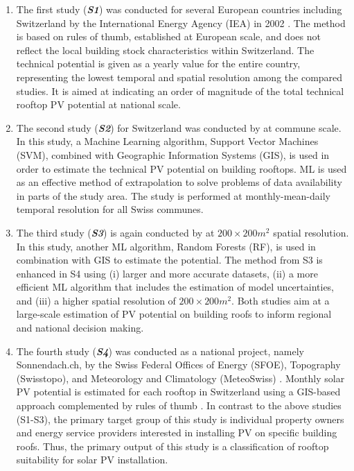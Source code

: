 \begin{enumerate}
\item The first study (\textit{\textbf{S1}}) was conducted for several European countries including Switzerland by the International Energy Agency (IEA) in 2002 \cite{iea_potential_2002}. The method is based on rules of thumb, established at European scale, and does not reflect the local building stock characteristics within Switzerland. The technical potential is given as a yearly value for the entire country, representing the lowest temporal and spatial resolution among the compared studies. It is aimed at indicating an order of magnitude of the total technical rooftop PV potential at national scale. 
\item The second study (\textit{\textbf{S2}}) for Switzerland was conducted by \citet{assouline_quantifying_2017} at commune scale. In this study, a Machine Learning algorithm, Support Vector Machines (SVM), combined with Geographic Information Systems (GIS), is used in order to estimate the technical PV potential on building rooftops. ML is used as an effective method of extrapolation to solve problems of data availability in parts of the study area. The study is performed at monthly-mean-daily temporal resolution for all Swiss communes. 
\item The third study (\textit{\textbf{S3}}) is again conducted by \citet{assouline_large-scale_2018} at $200 \times 200 m^2$ spatial resolution. In this study, another ML algorithm, Random Forests (RF), is used in combination with GIS to estimate the potential. The method from S3 is enhanced in S4 using (i) larger and more accurate datasets, (ii) a more efficient  ML algorithm that includes the estimation of model uncertainties, and (iii) a higher spatial resolution of $200 \times 200 m^2$. Both studies aim at a large-scale estimation of PV potential on building roofs to inform regional and national decision making.
\item The fourth study (\textbf{\textit{S4}}) was conducted as a national project, namely Sonnendach.ch, by the Swiss Federal Offices of Energy (SFOE), Topography (Swisstopo), and Meteorology and Climatology (MeteoSwiss) \cite{klauser_solarpotentialanalyse_2016,portmann_sonnendach.ch:_2016}. Monthly solar PV potential is estimated for each rooftop in Switzerland using a GIS-based approach \cite{klauser_solarpotentialanalyse_2016} complemented by rules of thumb \cite{portmann_sonnendach.ch:_2016}. In contrast to the above studies (S1-S3), the primary target group of this study is individual property owners and energy service providers interested in installing PV on specific building roofs. Thus, the primary output of this study is a classification of rooftop suitability for solar PV installation.

\end{enumerate}

